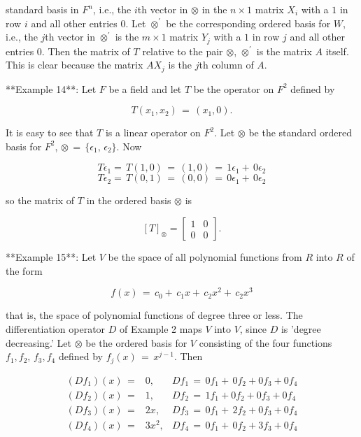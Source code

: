standard basis in \(F^{n}\), i.e., the \(i\)th vector in \(\otimes\) in the \(n\times 1\) matrix \(X_{i}\) with a \(1\) in row \(i\) and all other entries \(0\). Let \(\otimes^{\prime}\) be the corresponding ordered basis for \(W\), i.e., the \(j\)th vector in \(\otimes^{\prime}\) is the \(m\times 1\) matrix \(Y_{j}\) with a \(1\) in row \(j\) and all other entries \(0\). Then the matrix of \(T\) relative to the pair \(\otimes\), \(\otimes^{\prime}\) is the matrix \(A\) itself. This is clear because the matrix \(AX_{j}\) is the \(j\)th column of \(A\).

**Example 14**: Let \(F\) be a field and let \(T\) be the operator on \(F^{2}\) defined by

\[T(x_{1},x_{2})\,=\,(x_{1},0).\]

It is easy to see that \(T\) is a linear operator on \(F^{2}\). Let \(\otimes\) be the standard ordered basis for \(F^{2}\), \(\otimes\,=\,\{\epsilon_{1},\,\epsilon_{2}\}\). Now

\[T\epsilon_{1} =\,T(1,0)\,=\,(1,0)\,=\,1\epsilon_{1}+\,0\epsilon_{2}\] \[T\epsilon_{2} =\,T(0,1)\,=\,(0,0)\,=\,0\epsilon_{1}+\,0\epsilon_{2}\]

so the matrix of \(T\) in the ordered basis \(\otimes\) is

\[[T]_{\otimes}=\begin{bmatrix}1&0\\ 0&0\end{bmatrix}.\]

**Example 15**: Let \(V\) be the space of all polynomial functions from \(R\) into \(R\) of the form

\[f(x)\,=\,c_{0}+\,c_{1}x+\,c_{2}x^{2}+\,c_{2}x^{3}\]

that is, the space of polynomial functions of degree three or less. The differentiation operator \(D\) of Example 2 maps \(V\) into \(V\), since \(D\) is 'degree decreasing.' Let \(\otimes\) be the ordered basis for \(V\) consisting of the four functions \(f_{1},f_{2},\,f_{3},f_{4}\) defined by \(f_{j}(x)\,=\,x^{j-1}\). Then

\[\begin{array}{llll}(Df_{1})(x)\,=&0,&Df_{1}\,=\,0f_{1}+\,0f_{2}+0f_{3}+0f_{4 }\\ (Df_{2})(x)\,=&1,&Df_{2}\,=\,1f_{1}+0f_{2}+0f_{3}+0f_{4}\\ (Df_{3})(x)\,=&2x,&Df_{3}\,=\,0f_{1}+\,2f_{2}+0f_{3}+0f_{4}\\ (Df_{4})(x)\,=&3x^{2},&Df_{4}\,=\,0f_{1}+\,0f_{2}+3f_{3}+0f_{4}\\ \end{array}\]

